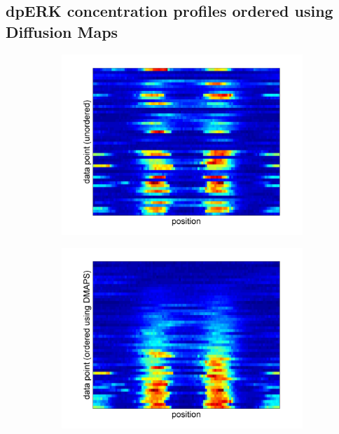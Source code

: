 \documentclass[10pt]{article}
\begin{document}
\subsection*{dpERK concentration profiles ordered using Diffusion Maps}
\begin{figure}[H]
\begin{subfigure}{0.3\textwidth}
\includegraphics[width=\textwidth]{data_unordered}
\caption{}
\end{subfigure}
\begin{subfigure}{0.3\textwidth}
\includegraphics[width=\textwidth]{data_ordered_DMAPS}
\caption{}
\end{subfigure}
\begin{subfigure}{0.3\textwidth}

\end{subfigure}
\end{figure}
\end{document}
